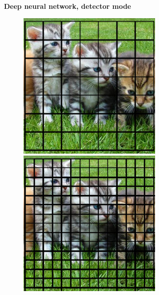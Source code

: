 \documentclass[xcolor=dvipsnames]{beamer}
\begin{document}
\begin{frame}{\bf Deep neural network, detector mode}

\begin{figure}[!htb]
  \centering
  \includegraphics[scale=0.4]{../../pictures/image_processing/squared.jpg}
  \includegraphics[scale=0.4]{../../pictures/image_processing/squared_overlap.jpg}
\end{figure}

\end{frame}
\end{document}
